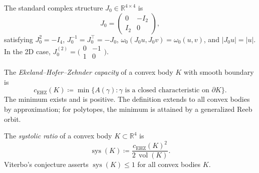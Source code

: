 \begin{unverified}
\begin{definition}\label{def:J0}
The standard complex structure $J_0 \in \mathbb{R}^{4 \times 4}$ is
\[
  J_0 = \begin{pmatrix} 0 & -I_2 \\ I_2 & 0 \end{pmatrix},
\]
satisfying $J_0^2 = -I_4$, $J_0^{-1} = J_0^\top = -J_0$,
$\omega_0(J_0 u, J_0 v) = \omega_0(u,v)$, and $|J_0 u| = |u|$.
In the 2D case, $J_0^{(2)} = \bigl(\begin{smallmatrix} 0 & -1 \\ 1 & 0 \end{smallmatrix}\bigr)$.
\end{definition}
\end{unverified}



\begin{definition}\label{def:ehz-capacity}
The \emph{Ekeland--Hofer--Zehnder capacity} of a convex body $K$ with smooth
boundary is
\[
  c_{\mathrm{EHZ}}(K) \coloneqq \min\bigl\{ A(\gamma) :
  \gamma \text{ is a closed characteristic on } \partial K \bigr\}.
\]
The minimum exists and is positive.
The definition extends to all convex bodies by approximation;
for polytopes, the minimum is attained by a generalized Reeb orbit.
\end{definition}


\begin{unverified}
\begin{definition}\label{def:systolic-ratio}
The \emph{systolic ratio} of a convex body $K \subset \mathbb{R}^4$ is
\[
  \operatorname{sys}(K) \coloneqq \frac{c_{\mathrm{EHZ}}(K)^2}{2\,\operatorname{vol}(K)}.
\]
Viterbo's conjecture asserts $\operatorname{sys}(K) \leq 1$ for all convex bodies $K$.
\end{definition}
\end{unverified}


